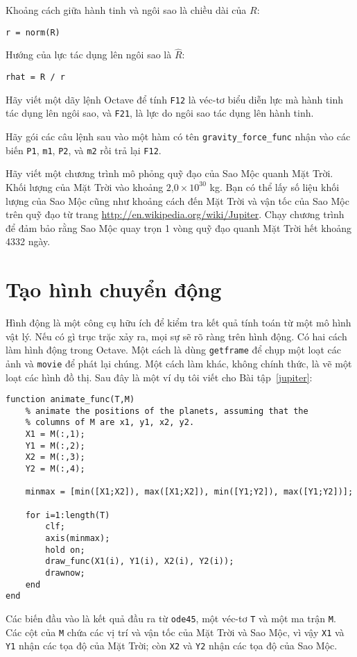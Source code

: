 \documentclass[12pt]{book}
\begin{document}
Khoảng cách giữa hành tinh và ngôi sao là chiều dài của $R$:

\begin{verbatim}
r = norm(R)
\end{verbatim}
%
Hướng của lực tác dụng lên ngôi sao là $\hat{R}$:

\begin{verbatim}
rhat = R / r
\end{verbatim}

\begin{ex}
Hãy viết một dãy lệnh Octave để tính {\tt F12} là véc-tơ biểu diễn 
lực mà hành tinh tác dụng lên ngôi sao, và {\tt F21}, là lực do 
ngôi sao tác dụng lên hành tinh.
\end{ex}

\begin{ex}
Hãy gói các câu lệnh sau vào một hàm có tên \verb#gravity_force_func#
nhận vào các biến {\tt P1}, {\tt m1}, {\tt P2}, và {\tt m2} rồi trả lại {\tt F12}.
\end{ex}

\begin{ex}
\label{jupiter}
Hãy viết một chương trình  mô phỏng quỹ đạo của Sao Mộc quanh
Mặt Trời. Khối lượng của Mặt Trời vào khoảng $\mbox{2,0} \times 10^{30}$ kg. 
Bạn có thể lấy số liệu khối lượng của Sao Mộc cũng như khoảng cách
đến Mặt Trời và vận tốc của Sao Mộc trên quỹ đạo từ trang 
\url{http://en.wikipedia.org/wiki/Jupiter}. Chạy chương trình để
đảm bảo rằng Sao Mộc quay trọn 1 vòng quỹ đạo quanh Mặt Trời
hết khoảng 4332 ngày.
\end{ex}


\section{Tạo hình chuyển động}

Hình động là một công cụ hữu ích để kiểm tra kết quả tính toán từ
một mô hình vật lý. Nếu có gì trục trặc xảy ra, mọi sự sẽ rõ ràng
trên hình động. Có hai cách làm hình động trong Octave. Một cách
là dùng {\tt getframe} để chụp một loạt các ảnh và {\tt movie} để
phát lại chúng. Một cách làm khác, không chính thức, là vẽ một loạt
các hình đồ thị. Sau đây là một ví dụ tôi viết cho Bài tập~\ref{jupiter}:

\begin{verbatim}
function animate_func(T,M)
    % animate the positions of the planets, assuming that the
    % columns of M are x1, y1, x2, y2.
    X1 = M(:,1);
    Y1 = M(:,2);
    X2 = M(:,3);
    Y2 = M(:,4);

    minmax = [min([X1;X2]), max([X1;X2]), min([Y1;Y2]), max([Y1;Y2])];

    for i=1:length(T)
        clf;
        axis(minmax);
        hold on;
        draw_func(X1(i), Y1(i), X2(i), Y2(i));
        drawnow;
    end
end
\end{verbatim}
%
Các biến đầu vào là kết quả đầu ra từ {\tt ode45}, một véc-tơ
{\tt T} và một ma trận {\tt M}. Các cột của {\tt M} chứa các
vị trí và vận tốc của Mặt Trời và Sao Mộc, vì vậy
{\tt X1} và {\tt Y1} nhận các tọa độ của Mặt Trời; còn
{\tt X2} và {\tt Y2} nhận các tọa độ của Sao Mộc.
\end{document}
